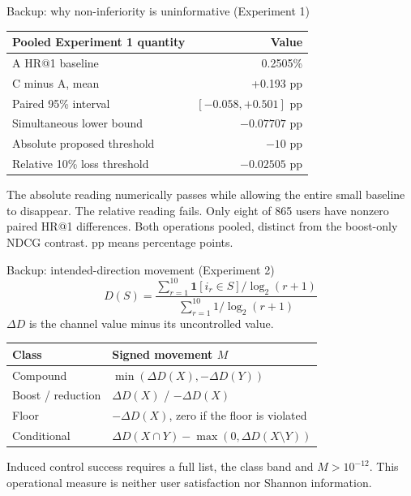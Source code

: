 \documentclass[10pt]{beamer}
\newcommand{\toprule}{\hline}
\newcommand{\midrule}{\hline}
\newcommand{\bottomrule}{\hline}
\newcommand{\src}[1]{\vfill{\tiny\color{bcitgray}#1}}
\begin{document}
\begin{frame}{Backup: why non-inferiority is uninformative (Experiment 1)}
\small
\begin{tabular}{@{}P{6.6cm}r@{}}
\toprule
Pooled Experiment 1 quantity & Value\\\midrule
A HR@1 baseline & 0.2505\%\\
C minus A, mean & +0.193 pp\\
Paired 95\% interval & $[-0.058,+0.501]$ pp\\
Simultaneous lower bound & $-0.07707$ pp\\
Absolute proposed threshold & $-10$ pp\\
Relative 10\% loss threshold & $-0.02505$ pp\\\bottomrule
\end{tabular}\par
\vspace{0.3cm}
The absolute reading numerically passes while allowing the entire small baseline to disappear. The relative reading fails. Only eight of 865 users have nonzero paired HR@1 differences.
\src{Both operations pooled, distinct from the boost-only NDCG contrast. pp means percentage points.}
\end{frame}

\begin{frame}{Backup: intended-direction movement (Experiment 2)}
\small
\[
D(S)=\frac{\sum_{r=1}^{10}\mathbf{1}[i_r\in S]/\log_2(r+1)}{\sum_{r=1}^{10}1/\log_2(r+1)}
\]
$\Delta D$ is the channel value minus its uncontrolled value.
\begin{tabular}{@{}P{2.7cm}P{7.0cm}@{}}
\toprule
Class & Signed movement $M$\\\midrule
Compound & $\min(\Delta D(X),-\Delta D(Y))$\\
Boost / reduction & $\Delta D(X)$ / $-\Delta D(X)$\\
Floor & $-\Delta D(X)$, zero if the floor is violated\\
Conditional & $\Delta D(X\cap Y)-\max(0,\Delta D(X\setminus Y))$\\\bottomrule
\end{tabular}\par
\vspace{0.25cm}
Induced control success requires a full list, the class band and $M>10^{-12}$. This operational measure is neither user satisfaction nor Shannon information.
\end{frame}
\end{document}
